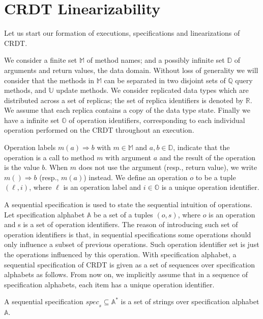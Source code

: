 
\section{CRDT Linearizability}
\label{sec:crdt-lin}

Let us start our formation of executions, specifications and linearizations of CRDT.

We consider a finite set $\mathbb{M}$ of method names; and a possibly infinite set $\mathbb{D}$ of arguments and return values, the data domain. Without loss of generality we will consider that the methods in $\mathbb{M}$ can be separated in two disjoint sets of $\mathbb{Q}$ query methods, and $\mathbb{U}$ update methods. We consider replicated data types which are distributed across a set of replicas; the set of replica identifiers is denoted by $\mathbb{R}$. We assume that each replica contains a copy of the data type state. Finally we have a infinite set $\mathbb{O}$ of operation identifiers, corresponding to each individual operation performed on the CRDT throughout an execution.

Operation labels \mbox{$m(a)\Rightarrow b$} with $m \in \mathbb{M}$ and $a,b \in \mathbb{D}$, indicate that the operation is a call to method $m$ with argument $a$ and the result of the operation is the value $b$. When $m$ does not use the argument (resp., return value), we write $m()\Rightarrow b$ (resp., $m(a)$) instead. We define an operation $o$ to be a tuple $(\ell,i)$, where $\ell$ is an operation label and $i \in \mathbb{O}$ is a unique operation identifier.

 A sequential specification is used to state the sequential intuition of operations. Let specification alphabet $\mathbb{A}$ be a set of a tuples $(o,s)$, where $o$ is an operation and s is a set of operation identifiers. The reason of introducing such set of operation identifiers is that, in sequential specifications some operations should only influence a subset of previous operations. Such operation identifier set is just the operations influenced by this operation. With specification alphabet, a sequential specification of CRDT is given as a set of sequences over specification alphabets as follows. From now on, we implicitly assume that in a sequence of specification alphabets, each item has a unique operation identifier.

\begin{definition}
\label{definition:sequential specification}
A sequential specification $\mathit{spec}_s \subseteq \mathbb{A}^*$ is a set of strings over specification alphabet $\mathbb{A}$.
\end{definition}

